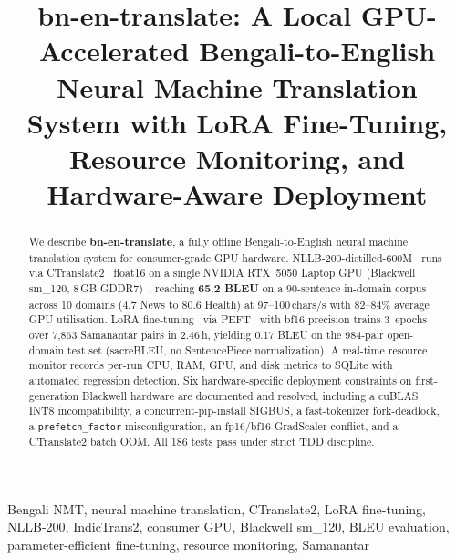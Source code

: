 \documentclass[conference]{IEEEtran}
\newcommand{\POSTFTBLEU}{0.17}
\newcommand{\TRAINDURATION}{2.46\,h}
\begin{document}

\title{bn-en-translate: A Local GPU-Accelerated Bengali-to-English Neural
Machine Translation System with LoRA Fine-Tuning, Resource Monitoring,
and Hardware-Aware Deployment}

\author{
}

\maketitle

\begin{abstract}
We describe \textbf{bn-en-translate}, a fully offline Bengali-to-English neural
machine translation system for consumer-grade GPU hardware.
NLLB-200-distilled-600M~\cite{nllb2022} runs via CTranslate2~\cite{ctranslate2_klein}
float16 on a single NVIDIA RTX~5050 Laptop GPU (Blackwell sm\_120, 8\,GB
GDDR7)~\cite{nvidia_blackwell}, reaching \textbf{65.2 BLEU} on a 90-sentence
in-domain corpus across 10 domains (4.7 News to 80.6 Health) at
97--100\,chars/s with 82--84\% average GPU utilisation.
LoRA fine-tuning~\cite{hu2021lora} via PEFT~\cite{peft2022} with bf16 precision
trains 3~epochs over 7,863 Samanantar pairs in \TRAINDURATION, yielding \POSTFTBLEU{}
BLEU on the 984-pair open-domain test set (sacreBLEU, no SentencePiece normalization).
A real-time resource monitor records per-run CPU, RAM, GPU, and disk metrics to
SQLite with automated regression detection.
Six hardware-specific deployment constraints on first-generation Blackwell hardware
are documented and resolved, including a cuBLAS INT8 incompatibility, a
concurrent-pip-install SIGBUS, a fast-tokenizer fork-deadlock, a
\texttt{prefetch\_factor} misconfiguration, an fp16/bf16 GradScaler conflict,
and a CTranslate2 batch OOM.
All 186 tests pass under strict TDD discipline.
\end{abstract}

\begin{IEEEkeywords}
Bengali NMT, neural machine translation, CTranslate2, LoRA fine-tuning, NLLB-200,
IndicTrans2, consumer GPU, Blackwell sm\_120, BLEU evaluation, parameter-efficient
fine-tuning, resource monitoring, Samanantar
\end{IEEEkeywords}
\end{document}
